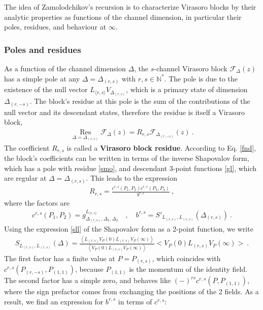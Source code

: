 \documentclass[12pt, a4paper]{article}
\newcommand{\myindex}[1]{\textbf{\boldmath #1}}
\theoremstyle{break}
\begin{document}
The idea of Zamolodchikov's recursion is to characterize Virasoro blocks by their analytic properties as functions of the channel dimension, in particular their poles, residues, and behaviour at $\infty$. 

\subsubsection{Poles and residues}

As a function of the channel dimension $\Delta$, the $s$-channel Virasoro block $\mathcal{F}_\Delta(z)$ has a simple pole at any $\Delta=\Delta_{(r,s)}$ with $r,s\in\mathbb{N}^*$. 
The pole is due to the existence of the null vector $L_{\langle r,s\rangle}V_{\Delta_{(r,s)}}$, which is a primary state of dimension $\Delta_{(r,-s)}$. The block's residue at this pole is the sum of the contributions of the null vector and its descendant states, therefore the residue is itself a Virasoro block,
\begin{align}
 \boxed{\underset{\Delta=\Delta_{(r,s)}}{\operatorname{Res}} \mathcal{F}_\Delta(z) = R_{r,s}\mathcal{F}_{\Delta_{(r,-s)}}(z)}\ .
 \label{resf}
\end{align}
The coefficient $R_{r,s}$ is called a \myindex{Virasoro block residue}. 
According to Eq. \eqref{fnd}, the block's coefficients can be written in terms of the inverse Shapovalov form, which has a pole with residue \eqref{smo}, and descendant 3-point functions \eqref{gl}, which are regular at $\Delta=\Delta_{(r,s)}$. This leads to the expression \begin{align}
\boxed{R_{r,s} = \frac{c^{r,s}(P_1,P_2)c^{r,s}(P_3,P_4)}{b^{r,s}}}\ , 
 \label{rrs}
\end{align}
where the factors are 
\begin{align}
 c^{r,s}(P_1,P_2) = g^{L_{\langle r,s\rangle}}_{\Delta_{(r,s)},\Delta_1,\Delta_2} \quad , \quad b^{r,s} =
 S'_{L_{(r,s)},L_{(r,s)}}(\Delta_{(r,s)})\ .
\end{align}
Using the expression \eqref{sll} of the Shapovalov form as a 2-point function, we write
\begin{align}
 S_{L_{(r,s)},L_{(r,s)}}(\Delta) = \frac{ \left<L_{(r,s)}V_P(0)L_{(r,s)}V_P(\infty)\right>}{\left<V_P(0)L_{(r,s)}V_P(\infty)\right>} \Big<V_P(0)L_{(r,s)}V_P(\infty)\Big> \ . 
\end{align}
The first factor has a finite value at $P=P_{(r,s)}$, which coincides with $c^{r,s}(P_{(r,-s)},P_{(1,1)})$, because $P_{(1,1)}$ is the momentum of the identity field. The second factor has a simple zero, and behaves like $(-)^{rs} c^{r,s}(P, P_{(1,1)})$, where the sign prefactor comes from exchanging the positions of the 2 fields. As a result, we find an expression for $b^{r,s}$ in terms of $c^{r,s}$:
\end{document}
